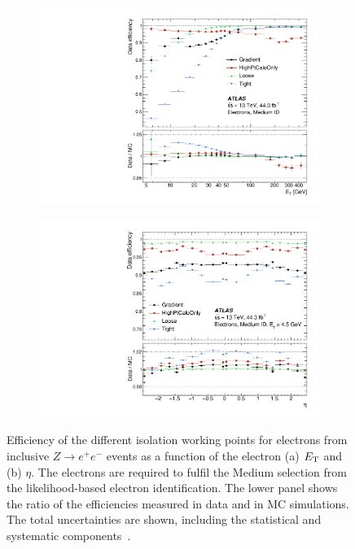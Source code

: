 \begin{figure}[]
    \centering
    \begin{subfigure}[b]{0.49\textwidth}
        \centering
        \includegraphics[width=\textwidth]{figures/reconstruction/figures_ele_iso_eff_sf_vs_pt_data17_MediumLH_4WPs.pdf}
        \caption{}
        \label{fig:method:reco:isoetaeff}
    \end{subfigure}
    \begin{subfigure}[b]{0.49\textwidth}
        \centering
        \includegraphics[width=\textwidth]{figures/reconstruction/figures_ele_iso_eff_sf_vs_eta_data17_MediumLH_4WPs.pdf}
        \caption{}
        \label{fig:method:reco:isopteff}
    \end{subfigure}
    \caption[Electron isolation efficiency as a function of $\eta$ and as a function of $E_T$ for the isolation working points]{Efficiency of the different isolation working points for electrons
    from inclusive $Z \rightarrow e^+e^-$ events as a function of the electron (a) $E_{\text{T}}$ and
    (b) $\eta$. The electrons are required to fulfil the Medium selection from the likelihood-based electron identification. The lower panel shows the ratio of the efficiencies measured in data and in MC simulations. The total uncertainties are shown, including the statistical and systematic components~\cite{Aad:2019tso}.}
    \label{fig:method:reco:isoeleff}
\end{figure}

